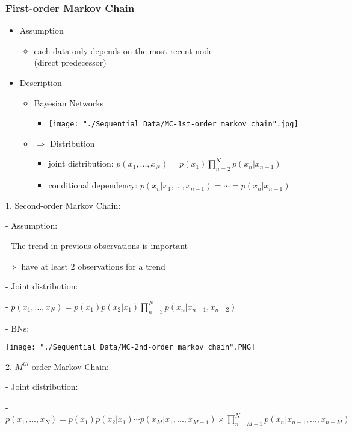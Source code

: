 \subsubsection{First-order Markov Chain}
\begin{itemize}
\item Assumption
	\begin{itemize}
	\item each data only depends on the most recent node \\
	(direct predecessor)
	\end{itemize}
\item Description
	\begin{itemize}
	\item Bayesian Networks 
		\begin{itemize}
		\item \texttt{[image: "./Sequential Data/MC-1st-order markov chain".jpg]}
		\end{itemize}
	\item $\Rightarrow$ Distribution
		\begin{itemize}
		\item joint distribution: $\displaystyle p(x_1,...,x_N) = p(x_1) \prod_{n=2}^N p(x_n|x_{n-1})$
		\item conditional dependency: $p(x_n|x_1,...,x_{n-1}) = \cdots = p(x_n|x_{n-1})$
		\end{itemize}
	\end{itemize}
\end{itemize}

1. Second-order Markov Chain:

   - Assumption:

     - The trend in previous observations is important

       $\Rightarrow$ have at least 2 observations for a trend

   - Joint distribution:

     - $\displaystyle p(x_1,...,x_N) = p(x_1)p(x_2|x_1) \prod _{n=3}^N p(x_n|x_{n-1},x_{n-2})$ 

     - BNs:

	\texttt{[image: "./Sequential Data/MC-2nd-order markov chain".PNG]}

2. $M^{th}$-order Markov Chain:

   - Joint distribution:

     - $\displaystyle p(x_1,...,x_N) = p(x_1)p(x_2|x_1)\cdots p(x_M|x_1,...,x_{M-1}) \times \prod_{n=M+1}^N p(x_n|x_{n-1},...,x_{n-M}) $ 

